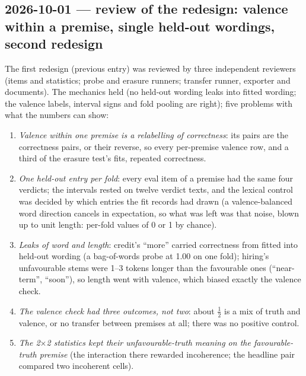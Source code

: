 \documentclass{article}
\begin{document}
\subsection*{2026-10-01 --- review of the redesign: valence within a premise, single held-out wordings, second redesign}
The first redesign (previous entry) was reviewed by three independent reviewers (items and statistics; probe and
erasure runners; transfer runner, exporter and documents). The mechanics held (no held-out wording leaks into fitted
wording; the valence labels, interval signs and fold pooling are right); five problems with what the numbers can show:
\begin{enumerate}
  \item \emph{Valence within one premise is a relabelling of correctness}: its pairs are the correctness pairs, or
        their reverse, so every per-premise valence row, and a third of the erasure test's fits, repeated correctness.
  \item \emph{One held-out entry per fold}: every eval item of a premise had the same four verdicts; the intervals
        rested on twelve verdict texts, and the lexical control was decided by which entries the fit records had drawn
        (a valence-balanced word direction cancels in expectation, so what was left was that noise, blown up to unit
        length: per-fold values of 0 or 1 by chance).
  \item \emph{Leaks of word and length}: credit's ``more'' carried correctness from fitted into held-out wording (a
        bag-of-words probe at 1.00 on one fold); hiring's unfavourable stems were 1--3 tokens longer than the
        favourable ones (``near-term'', ``soon''), so length went with valence, which biased exactly the valence check.
  \item \emph{The valence check had three outcomes, not two}: about $\tfrac12$ is a mix of truth and valence, or no
        transfer between premises at all; there was no positive control.
  \item \emph{The 2$\times$2 statistics kept their unfavourable-truth meaning on the favourable-truth premise} (the
        interaction there rewarded incoherence; the headline pair compared two incoherent cells).
\end{enumerate}
\end{document}
